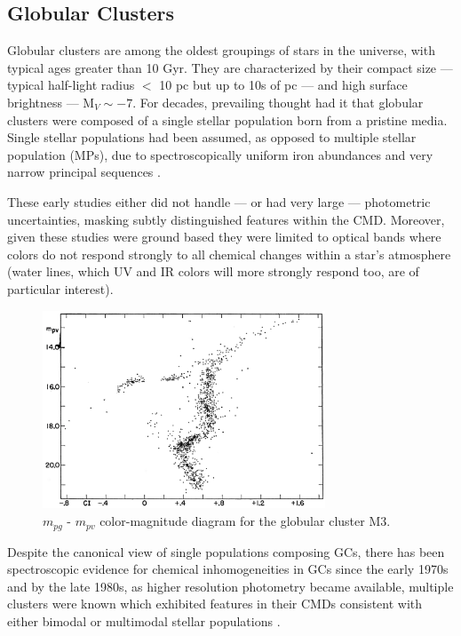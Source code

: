 \subsection{Globular Clusters}\label{sec:intro_GC}
Globular clusters \citep[GC,][]{Herschel1814} are among the oldest groupings of
stars in the universe, with typical ages greater than 10 Gyr. They are
characterized by their compact size --- typical half-light radius $<$ 10 pc but
up to 10s of pc --- and high surface brightness --- M$_{V} \sim -7$. For
decades, prevailing thought had it that globular clusters were composed of a single
stellar population born from a pristine media. Single stellar
populations had been assumed, as opposed to multiple stellar population
(MPs), due to spectroscopically uniform iron abundances \citep{Gratton2012} and
very narrow principal sequences \citep[e.g. Figure \ref{fig:M3CMD} taken
from][]{Sandage1953, Stetson1988}.

These early studies either did not handle --- or had very large --- photometric
uncertainties, masking subtly distinguished features within the CMD. Moreover,
given these studies were ground based they were limited to optical bands where
colors do not respond strongly to all chemical changes within a star's
atmosphere (water lines, which UV and IR colors will more strongly
respond too, are of particular interest).

\begin{figure}
	\centering
	\includegraphics[width=0.75\textwidth]{src/Figures/Gould53.png}
	\caption{$m_{pg}$ - $m_{pv}$ color-magnitude diagram for the globular cluster M3.}
	\label{fig:M3CMD}
\end{figure}

Despite the canonical view of single populations composing GCs, there has been
spectroscopic evidence for chemical inhomogeneities in GCs since the early
1970s \citep[e.g.][]{Osborn1971} and by the late 1980s, as higher resolution
photometry became available, multiple clusters were known which exhibited
features in their CMDs consistent with either bimodal or multimodal stellar
populations \citep[e.g.][]{Norris1987}.

